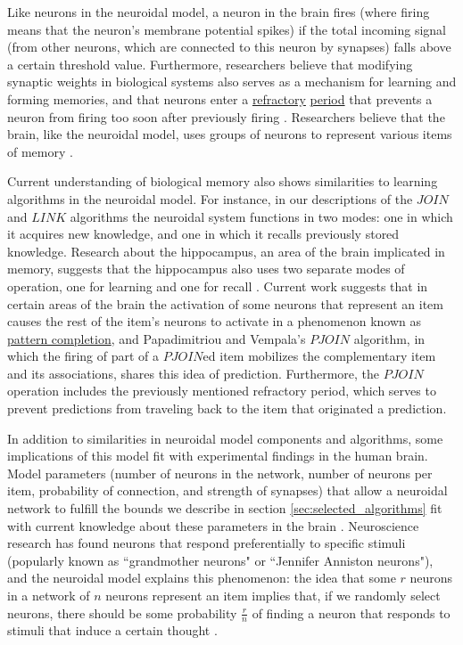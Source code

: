 \documentclass[letterpaper, 12pt]{article}
\begin{document}
Like neurons in the neuroidal model, a neuron in the brain fires (where firing means that the neuron's membrane potential spikes) if the total incoming signal (from other neurons, which are connected to this neuron by synapses) falls above a certain threshold value. Furthermore, researchers believe that modifying synaptic weights in biological systems also serves as a mechanism for learning and forming memories, and that neurons enter a \underline{refractory} \underline{period} that prevents a neuron from firing too soon after previously firing \cite{cooper_donald_2005}. Researchers believe that the brain, like the neuroidal model, uses groups of neurons to represent various items of memory \cite{schacter_richard_1978}.

Current understanding of biological memory also shows similarities to learning algorithms in the neuroidal model. For instance, in our descriptions of the $JOIN$ and $LINK$ algorithms the neuroidal system functions in two modes: one in which it acquires new knowledge, and one in which it recalls previously stored knowledge. Research about the hippocampus, an area of the brain implicated in memory, suggests that the hippocampus also uses two separate modes of operation, one for learning and one for recall \cite{treves_computational_1992}. Current work suggests that in certain areas of the brain the activation of some neurons that represent an item causes the rest of the item's neurons to activate in a phenomenon known as \underline{pattern completion}, and Papadimitriou and Vempala's $PJOIN$ algorithm, in which the firing of part of a $PJOIN$ed item mobilizes the complementary item and its associations, shares this idea of prediction. Furthermore, the $PJOIN$ operation includes the previously mentioned refractory period, which serves to prevent predictions from traveling back to the item that originated a prediction.

In addition to similarities in neuroidal model components and algorithms, some implications of this model fit with experimental findings in the human brain. Model parameters (number of neurons in the network, number of neurons per item, probability of connection, and strength of synapses) that allow a neuroidal network to fulfill the bounds we describe in section \ref{sec:selected_algorithms} fit with current knowledge about these parameters in the brain \cite{valiant_memorization_2005, valiant_quantitative_2006}. Neuroscience research has found neurons that respond preferentially to specific stimuli (popularly known as ``grandmother neurons" or ``Jennifer Anniston neurons"), and the neuroidal model explains this phenomenon: the idea that some $r$ neurons in a network of $n$ neurons represent an item implies that, if we randomly select neurons, there should be some probability $\frac{r}{n}$ of finding a neuron that responds to stimuli that induce a certain thought \cite{quiroga_invariant_2005, valiant_quantitative_2006}.
\end{document}
